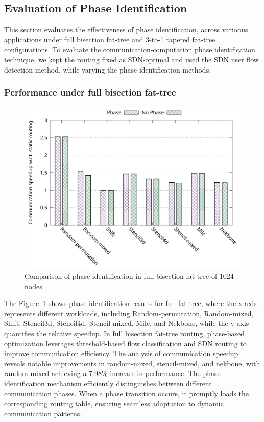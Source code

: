 \subsection{Evaluation of Phase Identification}
This section evaluates the effectiveness of phase identification, across varioous applications under full bisection fat-tree and 3-to-1 tapered fat-tree configurations. To evaluate the communication‑computation phase identification technique, we kept the routing fixed as SDN‑optimal and used the SDN user flow detection method, while varying the phase identification methods.

\subsubsection{Performance under full bisection fat-tree}


\begin{figure}[h]
  \centering
  \includegraphics[width=\columnwidth]{./figs_4/phase_full.pdf}
  \caption{Comparison of phase identification in full bisection fat-tree of 1024 nodes}
  \label{fig:phase_full}
\end{figure}
The Figure~\ref{fig:phase_full} shows phase identification results for full fat-tree, where the x-axis represents different workloads, including Random-permutation, Random-mixed, Shift, Stencil3d, Stencil4d, Stencil-mixed, Milc, and Nekbone, while the y-axis quantifies the relative speedup. 
In full bisection fat-tree routing, phase-based optimization leverages threshold-based flow classification and SDN routing to improve communication efficiency. The analysis of communication speedup reveals notable improvements in random-mixed, stencil-mixed, and nekbone, with random-mixed achieving a 7.98\% increase in performance. The phase identification mechanism efficiently distinguishes between different communication phases. When a phase transition occurs, it promptly loads the corresponding routing table, ensuring seamless adaptation to dynamic communication patterns.

